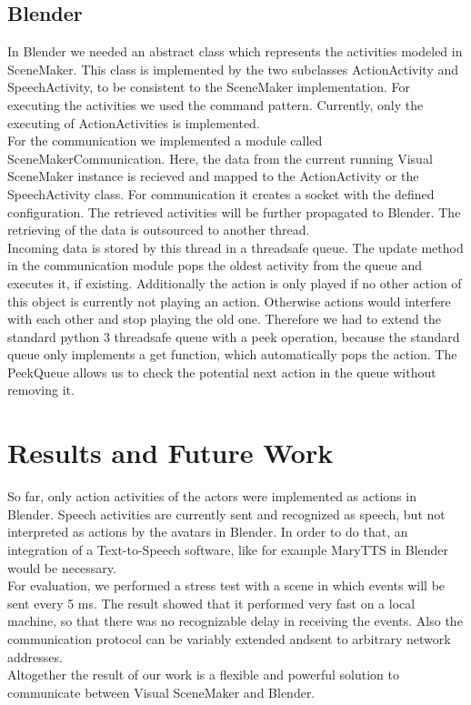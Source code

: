 \documentclass[
10pt, %
a4paper, %
oneside,
headinclude,footinclude, %
BCOR 0mm, %
]{scrartcl}
\begin{document}
\subsection*{Blender}
In Blender we needed an abstract class which represents the activities modeled in SceneMaker. This class is implemented by the two subclasses  ActionActivity and SpeechActivity, to be consistent to the SceneMaker implementation. For executing the activities we used the command pattern. Currently, only the executing of ActionActivities is implemented.\\
For the communication we implemented a module called SceneMakerCommunication. Here, the data from the current running Visual SceneMaker instance is recieved and mapped to the ActionActivity or the SpeechActivity class. For communication it creates a socket with the defined configuration. The retrieved
activities will be further propagated to Blender. The retrieving of the data is outsourced to another thread.\\
Incoming data is stored by this thread in a threadsafe queue. The update method in the communication module pops the oldest activity from the queue and executes it, if existing. Additionally the action is only played if no other action of this object is currently not playing an action. Otherwise actions would interfere with each other and stop playing the old one. Therefore we had to extend the standard python 3 threadsafe queue with a peek operation, because the standard queue only implements a get function, which automatically pops the action. The PeekQueue allows us to check the potential next action in the queue without removing it.


\section{Results and Future Work}
So far, only action activities of the actors were implemented as actions in Blender. Speech activities are currently sent and recognized as speech, but not interpreted as actions by the avatars in Blender. In order to do that, an integration of a Text-to-Speech software, like for example MaryTTS in Blender would be necessary. \\
For evaluation, we performed a stress test with a scene in which events will be sent every 5 ms. The result showed that it performed very fast on a local machine, so that there was no recognizable delay in receiving the events. Also the communication protocol can be variably extended andsent to arbitrary network addresses.\\
Altogether the result of our work is a flexible and powerful solution to communicate between Visual SceneMaker and Blender.
\end{document}
